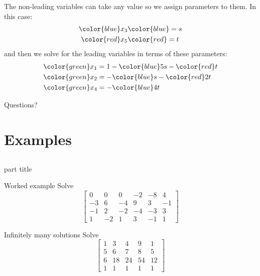 \documentclass{beamer}
\begin{document}
\begin{frame}
  The non-leading variables can take any value so we assign parameters to them.\vfill
  In this case:
  \begin{align*}
    {\color{blue}x_3} &{\color{blue}= s}\\
    {\color{red}x_5} &{\color{red}= t}
  \end{align*}
  and then we solve for the leading variables in terms of these parameters:
  \begin{align*}
    {\color{green}x_1} &= 1-{\color{blue}5s}-{\color{red}t}\\
    {\color{green}x_2} &= -{\color{blue}s}-{\color{red}2t}\\
    {\color{green}x_4} &= -{\color{blue}4t}
  \end{align*}
\end{frame}

\begin{frame}
  Questions?
\end{frame}


\section{Examples}
\subsection{}

\begin{frame}
    \begin{beamercolorbox}[sep=12pt,center]{part title}
      \insertsection\par
    \end{beamercolorbox}
\end{frame}

\begin{frame}{Worked example}
  Solve
  \begin{equation*}
      \left[
        \begin{array}{rrrrr|r}
          0 & 0 & 0 & -2 & -8 & 4 \\
          -3 & 6 & -4 & 9 & 3 & -1 \\
          -1 & 2 & -2 & -4 & -3 & 3 \\
          1 & -2 & 1 & 3 & -1 & 1
        \end{array}\right] 
    \end{equation*}
\end{frame}

\begin{frame}{Infinitely many solutions}
  Solve
  \begin{equation*}
      \left[
        \begin{array}{rrrr|r}
          1 & 3 & 4 & 9 & 1 \\
          5 & 6 & 7 & 8 & 5 \\
          6 & 18 & 24 & 54 & 12 \\
          1 & 1 & 1 & 1 & 1
        \end{array}\right] 
    \end{equation*}
\end{frame}
\end{document}
